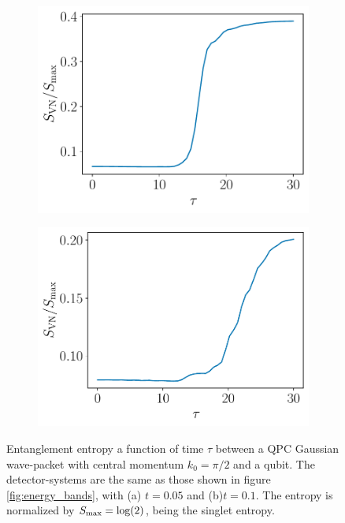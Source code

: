\documentclass{article}
\begin{document}
\begin{figure}[h]
    \centering
    \begin{subfigure}[b]{0.43\textwidth}
        \includegraphics[width=\textwidth]{figures/report_08_2025/entropy_time_exact_Lqpc=60_Omega=0.4_t=0.05.pdf}
        \caption{}
    \end{subfigure}
    \hspace{0.001\textwidth}
    \begin{subfigure}[b]{0.43\textwidth}
        \includegraphics[width=\textwidth]{figures/report_08_2025/entropy_time_exact_Lqpc=60_Omega=0.4_t=0.1.pdf}
        \caption{}
    \end{subfigure}
    \caption{Entanglement entropy a function of time $\tau$ between a QPC Gaussian wave-packet with central momentum $k_0 = \pi/2$ and a qubit. The detector-systems are the same as those shown in figure \ref{fig:energy_bands}, with (a) $t=0.05$ and (b)$t=0.1$. The entropy is normalized by $S_{\rm{max}} = \log(2)$, being the singlet entropy.}
    \label{fig:entropy_in_time}
\end{figure}
\end{document}
